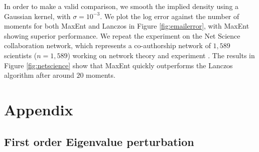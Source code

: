\documentclass[letterpaper]{article} %
\begin{document}
%	

\label{smoothinglancsoz}
In order to make a valid comparison, we smooth the implied density using a Gaussian kernel, with $\sigma = 10^{-3}$. %
We plot the log error against the number of moments for both MaxEnt and Lanczos in Figure \ref{fig:emailerror}, with MaxEnt showing superior performance.
We repeat the experiment on the Net Science collaboration network, which represents a co-authorship network of $1,589$ scientists ($n = 1,589$) working on network theory and experiment \citep{newman2006finding}. The results in Figure \ref{fig:netscience} show that MaxEnt quickly outperforms the Lanczos algorithm after around $20$ moments.

\section{Appendix}
\subsection{First order Eigenvalue perturbation}
\end{document}
